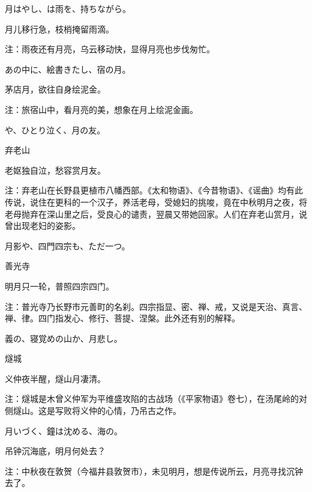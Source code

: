 \begin{haiku}
    {\FH 月はやし、は雨を、持ちながら。}

    {\FK 月儿移行急，枝梢掩留雨滴。}

    {\FT 注：雨夜还有月亮，乌云移动快，显得月亮也步伐匆忙。}
\end{haiku}

\begin{haiku}
    {\FH あの中に、絵書きたし、宿の月。}

    {\FK 茅店月，欲往自身绘泥金。}

    {\FT 注：旅宿山中，看月亮的美，想象在月上绘泥金画。}
\end{haiku}

\begin{haiku}
    {\FH {}や、ひとり泣く、月の友。}

    {\FK 弃老山}

    {\FK 老妪独自泣，愁容赏月友。}

    {\FT 注：弃老山在长野县更植市八幡西部。《太和物语》、《今昔物语》、《谣曲》均有此传说，说住在更科的一个汉子，养活老母，受媳妇的挑唆，竟在中秋明月之夜，将老母抛弃在深山里之后，受良心的谴责，翌晨又带她回家。人们在弃老山赏月，说曾出现老妇的姿影。}
\end{haiku}

\begin{haiku}
    {\FH 月影や、四門四宗も、ただ一つ。}

    {\FK 善光寺}

    {\FK 明月只一轮，普照四宗四门。}

    {\FT 注：普光寺乃长野市元善町的名刹。四宗指显、密、禅、戒，又说是天治、真言、禅、律。四门指发心、修行、菩提、涅槃。此外还有别的解释。}
\end{haiku}

\begin{haiku}
    {\FH 義の、寝覚めの山か、月悲し。}

    {\FK 燧城}

    {\FK 义仲夜半醒，燧山月凄清。}

    {\FT 注：燧城是木曾义仲军为平维盛攻陷的古战场（《平家物语》卷七），在汤尾岭的对侧燧山。这是写败将义仲的心情，乃吊古之作。}
\end{haiku}

\begin{haiku}
    {\FH 月いづく、鐘は沈める、海の。}

    {\FK 吊钟沉海底，明月何处去？}

    {\FT 注：中秋夜在敦贺（今福井县敦贺市），未见明月，想是传说所云，月亮寻找沉钟去了。}
\end{haiku}


